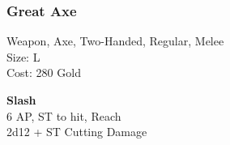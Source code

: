 \subsubsection{Great Axe}\label{weapon:greatAxe}
Weapon, Axe, Two-Handed, Regular, Melee\\
Size: L\\
Cost: 280 Gold

\textbf{Slash}\\
6 AP, ST to hit,  Reach\\
2d12 + ST Cutting Damage
